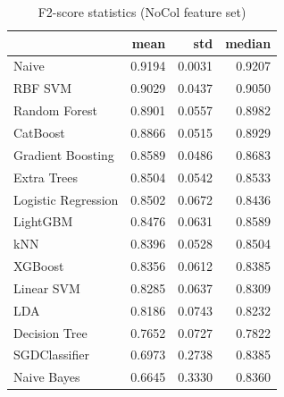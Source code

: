 \begin{table}
\caption{F2-score statistics (NoCol feature set)}
\label{tab:f2_NoCol_stats}
\begin{tabular}{lrrr}
\toprule
 & mean & std & median \\
\midrule
Naive & 0.9194 & 0.0031 & 0.9207 \\
RBF SVM & 0.9029 & 0.0437 & 0.9050 \\
Random Forest & 0.8901 & 0.0557 & 0.8982 \\
CatBoost & 0.8866 & 0.0515 & 0.8929 \\
Gradient Boosting & 0.8589 & 0.0486 & 0.8683 \\
Extra Trees & 0.8504 & 0.0542 & 0.8533 \\
Logistic Regression & 0.8502 & 0.0672 & 0.8436 \\
LightGBM & 0.8476 & 0.0631 & 0.8589 \\
kNN & 0.8396 & 0.0528 & 0.8504 \\
XGBoost & 0.8356 & 0.0612 & 0.8385 \\
Linear SVM & 0.8285 & 0.0637 & 0.8309 \\
LDA & 0.8186 & 0.0743 & 0.8232 \\
Decision Tree & 0.7652 & 0.0727 & 0.7822 \\
SGDClassifier & 0.6973 & 0.2738 & 0.8385 \\
Naive Bayes & 0.6645 & 0.3330 & 0.8360 \\
\bottomrule
\end{tabular}
\end{table}
